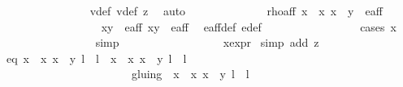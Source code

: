 \begin{isabellebody}
\ \ \ \ \ \ \ \ \ \ \ \ \ \ \isamarkupfalse%
\ v{}{\isacharunderscore}def\ v{}{\isacharunderscore}def\ z{}\ \isamarkupfalse%
\ auto\isanewline
\ \ \ \ \ \ \ \ \ \ \ \ \isamarkupfalse%
\ rho{\isacharunderscore}aff{\isacharcolon}\ {\isachardoublequoteopen}{\isacharparenleft}x\ {\isacharasterisk}\ x{\isacharprime}{\isacharcomma}\ x\ {\isacharasterisk}\ y{\isacharprime}{\isacharparenright}\ {\isasymin}\ e{\isacharunderscore}aff{\isachardoublequoteclose}\isanewline
\ \ \ \ \ \ \ \ \ \ \ \ \ \ \ \ \isamarkupfalse%
\ {\isacartoucheopen}{\isacharparenleft}x{\isacharcomma}y{\isacharparenright}\ {\isasymin}\ e{\isacharunderscore}aff{\isacartoucheclose}\ {\isacartoucheopen}{\isacharparenleft}x{\isacharprime}{\isacharcomma}y{\isacharprime}{\isacharparenright}\ {\isasymin}\ e{\isacharunderscore}aff{\isacartoucheclose}\ \isamarkupfalse%
\ e{\isacharunderscore}aff{\isacharunderscore}def\ e{\isacharprime}{\isacharunderscore}def\isanewline
\ \ \ \ \ \ \ \ \ \ \ \ \ \ \ \ \isamarkupfalse%
{\isacharparenleft}cases\ {\isachardoublequoteopen}x\ {\isacharequal}\ {}{\isachardoublequoteclose}{\isacharparenright}\isanewline
\ \ \ \ \ \ \ \ \ \ \ \ \ \ \ \ \isamarkupfalse%
{\isacharparenleft}simp{\isacharparenright}\isanewline
\ \ \ \ \ \ \ \ \ \ \ \ \ \ \ \ \isamarkupfalse%
\ x{\isacharunderscore}expr\ \isamarkupfalse%
{\isacharparenleft}simp\ add{\isacharcolon}\ z{}{\isacharparenright}\isanewline
\ \ \ \ \ \ \ \ \ \ \ \ \isamarkupfalse%
\ eq{\isacharcolon}\ {\isachardoublequoteopen}{\isacharbraceleft}{\isacharparenleft}{\isacharparenleft}x\ {\isacharasterisk}\ x{\isacharprime}{\isacharcomma}\ x\ {\isacharasterisk}\ y{\isacharprime}{\isacharparenright}{\isacharcomma}\ l\ {\isacharplus}\ l{\isacharprime}{\isacharparenright}{\isacharcomma}\ {\isacharparenleft}{\isasymtau}\ {\isacharparenleft}x\ {\isacharasterisk}\ x{\isacharprime}{\isacharcomma}\ x\ {\isacharasterisk}\ y{\isacharprime}{\isacharparenright}{\isacharcomma}\ l\ {\isacharplus}\ l{\isacharprime}\ {\isacharplus}\ {}{\isacharparenright}{\isacharbraceright}\isanewline
\ \ \ \ \ \ \ \ \ \ \ \ \ \ \ \ \ \ \ \ \ \ {\isacharequal}\ gluing\ {\isacharbackquote}{\isacharbackquote}\ {\isacharbraceleft}{\isacharparenleft}{\isacharparenleft}x\ {\isacharasterisk}\ x{\isacharprime}{\isacharcomma}\ x\ {\isacharasterisk}\ y{\isacharprime}{\isacharparenright}{\isacharcomma}\ l\ {\isacharplus}\ l{\isacharprime}{\isacharparenright}{\isacharbraceright}{\isachardoublequoteclose}\isanewline

\end{isabellebody}
